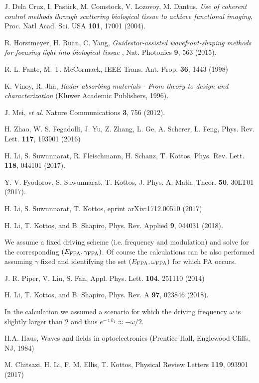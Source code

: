 \documentclass[aps,prl,twocolumn,showpacs,groupedaddress,amsmath,amssymb]{revtex4}
\begin{document}
\begin{thebibliography}{1}
J. Dela Cruz, I. Pastirk, M. Comstock, V. Lozovoy, M. Dantus, {\it Use of coherent control methods through scattering biological tissue to achieve functional imaging}, Proc. Natl Acad. Sci. USA {\bf 101}, 17001 (2004).

R. Horstmeyer, H. Ruan, C. Yang, {\it Guidestar-assisted wavefront-shaping methods for focusing light into biological tissue} , Nat. Photonics {\bf 9}, 563 (2015).

R. L. Fante, M. T. McCormack, IEEE Trans. Ant. Prop. {\bf 36}, 1443 (1998)

K. Vinoy, R. Jha, {\it Radar absorbing materials - From theory to design and characterization} (Kluwer Academic Publishers, 1996).

 J. Mei, {\it et al.} Nature Communications {\bf 3}, 756 (2012).

H. Zhao, W. S. Fegadolli, J. Yu, Z. Zhang, L. Ge, A. Scherer, L. Feng, Phys. Rev. Lett. {\bf 117}, 193901 (2016)

H. Li, S. Suwunnarat, R. Fleischmann, H. Schanz, T. Kottos, Phys. Rev. Lett. {\bf 118}, 044101 (2017).

Y. V. Fyodorov, S. Suwunnarat, T. Kottos, J. Phys. A: Math. Theor. {\bf 50}, 30LT01 (2017).

H. Li, S. Suwunnarat, T. Kottos, eprint arXiv:1712.00510 (2017)

 H. Li, T. Kottos, and B. Shapiro, Phys. Rev. Applied \textbf{9}, 044031 (2018). 

We assume a fixed driving scheme (i.e. frequency and modulation) and solve for the corresponding
$(E_{\rm FPA},\gamma_{\rm FPA})$. Of course the calculations can be also performed assuming $\gamma$ fixed and
identifying the set $(E_{\rm FPA},\omega_{\rm FPA})$ for which PA occurs.  


J. R. Piper, V. Liu, S. Fan, Appl. Phys. Lett. {\bf 104}, 251110 (2014)

H. Li, T. Kottos, and B. Shapiro, Phys. Rev. A \textbf{97}, 023846 (2018).

In the calculation we assumed a scenario for which the driving frequency $\omega$
is slightly larger than $2$ and thus $e^{-\imath k_{1}}\approx-\omega/2$.

H.A. Haus, Waves and fields in optoelectronics (Prentice-Hall, Englewood Cliffs, NJ, 1984)

M. Chitsazi, H. Li, F. M. Ellis, T. Kottos, Physical Review Letters {\bf 119}, 093901 (2017)
\end{thebibliography}
\end{document}
